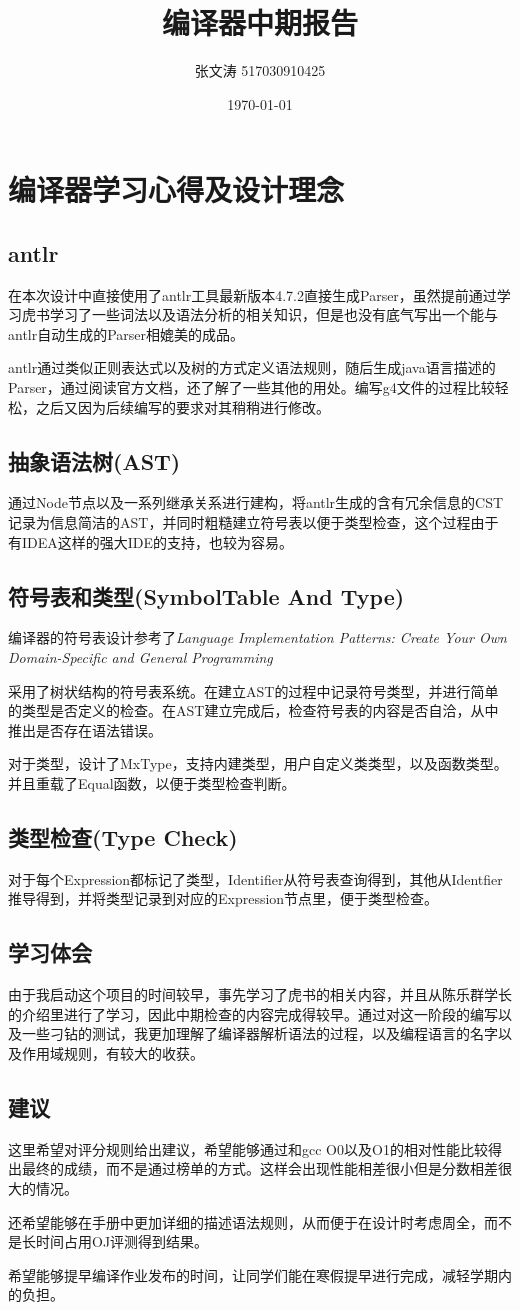 \documentclass{article}
\title{编译器中期报告}
\author{张文涛 517030910425}
\date{\today}
\begin{document}
	\maketitle
	\section{编译器学习心得及设计理念}
	\subsection{antlr}
	在本次设计中直接使用了antlr工具最新版本4.7.2直接生成Parser，虽然提前通过学习虎书学习了一些词法以及语法分析的相关知识，但是也没有底气写出一个能与antlr自动生成的Parser相媲美的成品。
	
	antlr通过类似正则表达式以及树的方式定义语法规则，随后生成java语言描述的Parser，通过阅读官方文档，还了解了一些其他的用处。编写g4文件的过程比较轻松，之后又因为后续编写的要求对其稍稍进行修改。
	\subsection{抽象语法树(AST)}
	通过Node节点以及一系列继承关系进行建构，将antlr生成的含有冗余信息的CST记录为信息简洁的AST，并同时粗糙建立符号表以便于类型检查，这个过程由于有IDEA这样的强大IDE的支持，也较为容易。
	\subsection{符号表和类型(SymbolTable And Type)}
	编译器的符号表设计参考了\emph{Language Implementation Patterns: Create Your Own Domain-Specific and General Programming}
	
	采用了树状结构的符号表系统。在建立AST的过程中记录符号类型，并进行简单的类型是否定义的检查。在AST建立完成后，检查符号表的内容是否自洽，从中推出是否存在语法错误。
	
	对于类型，设计了MxType，支持内建类型，用户自定义类类型，以及函数类型。并且重载了Equal函数，以便于类型检查判断。
	
	\subsection{类型检查(Type Check)}
	对于每个Expression都标记了类型，Identifier从符号表查询得到，其他从Identfier推导得到，并将类型记录到对应的Expression节点里，便于类型检查。
	
	\subsection{学习体会}
	由于我启动这个项目的时间较早，事先学习了虎书的相关内容，并且从陈乐群学长的介绍里进行了学习，因此中期检查的内容完成得较早。通过对这一阶段的编写以及一些刁钻的测试，我更加理解了编译器解析语法的过程，以及编程语言的名字以及作用域规则，有较大的收获。
	
	\subsection{建议}
	这里希望对评分规则给出建议，希望能够通过和gcc O0以及O1的相对性能比较得出最终的成绩，而不是通过榜单的方式。这样会出现性能相差很小但是分数相差很大的情况。
	
	还希望能够在手册中更加详细的描述语法规则，从而便于在设计时考虑周全，而不是长时间占用OJ评测得到结果。
	
	希望能够提早编译作业发布的时间，让同学们能在寒假提早进行完成，减轻学期内的负担。
\end{document}
